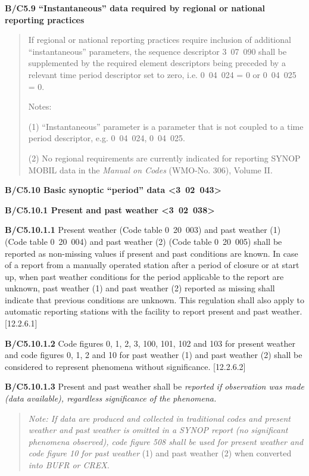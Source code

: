 \textbf{B/C5.9 ``Instantaneous'' data required by regional or national reporting practices}

\begin{quote}
If regional or national reporting practices require inclusion of additional ``instantaneous'' parameters, the sequence descriptor 3~07~090 shall be supplemented by the required element descriptors being preceded by a relevant time period descriptor set to zero, i.e. 0~04~024 = 0 or 0~04~025 = 0.

Notes:

(1) ``Instantaneous'' parameter is a parameter that is not coupled to a time period descriptor, e.g. 0~04~024, 0~04~025.

(2) No regional requirements are currently indicated for reporting SYNOP MOBIL data in the \emph{Manual on Codes} (WMO-No. 306), Volume II.
\end{quote}

\textbf{B/C5.10 Basic synoptic ``period'' data \textless3~02~043\textgreater{}}

\textbf{B/C5.10.1 Present and past weather \textless3~02~038\textgreater{}}

\textbf{B/C5.10.1.1} Present weather (Code table 0~20~003) and past weather (1) (Code table 0~20~004) and past weather (2) (Code table 0~20~005) shall be reported as non-missing values if present and past conditions are known. In case of a report from a manually operated station after a period of closure or at start up, when past weather conditions for the period applicable to the report are unknown, past weather (1) and past weather (2) reported as missing shall indicate that previous conditions are unknown. This regulation shall also apply to automatic reporting stations with the facility to report present and past weather. {[}12.2.6.1{]}

\textbf{B/C5.10.1.2} Code figures 0, 1, 2, 3, 100, 101, 102 and 103 for present weather and code figures 0, 1, 2 and 10 for past weather (1) and past weather (2) shall be considered to represent phenomena without significance. {[}12.2.6.2{]}

\textbf{B/C5.10.1.3} Present and past weather shall be \emph{reported if observation was made (data available), regardless significance of the phenomena.}

\begin{quote}
\emph{Note: If data are produced and collected in traditional codes and present weather and past weather is omitted in a SYNOP report (no significant phenomena observed), code figure 508 shall be used for present weather and code figure 10 for past weather} (1) and past weather (2) when converted \emph{into BUFR or CREX.}
\end{quote}

